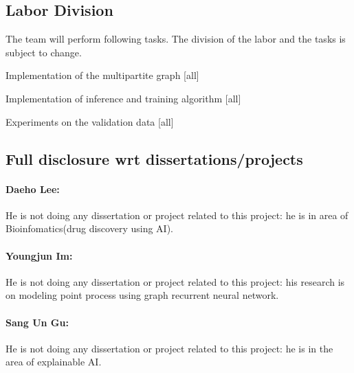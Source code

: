 \subsection{Labor Division}

The team will perform following tasks. The division of the labor and the tasks is subject to change.
\bit
\item Implementation of the multipartite graph [all]
\item Implementation of inference and training algorithm [all]
\item Experiments on the validation data [all]
\eit

\subsection{Full disclosure wrt dissertations/projects}

\paragraph{Daeho Lee:}
He is not doing any dissertation or project related to this project: he is in area of Bioinfomatics(drug discovery using AI).

\paragraph{Youngjun Im:}
He is not doing any dissertation or project related to this project: his research is on modeling point process using graph recurrent neural network.

\paragraph{Sang Un Gu:}
He is not doing any dissertation or project related to this project: he is in the area of explainable AI.
